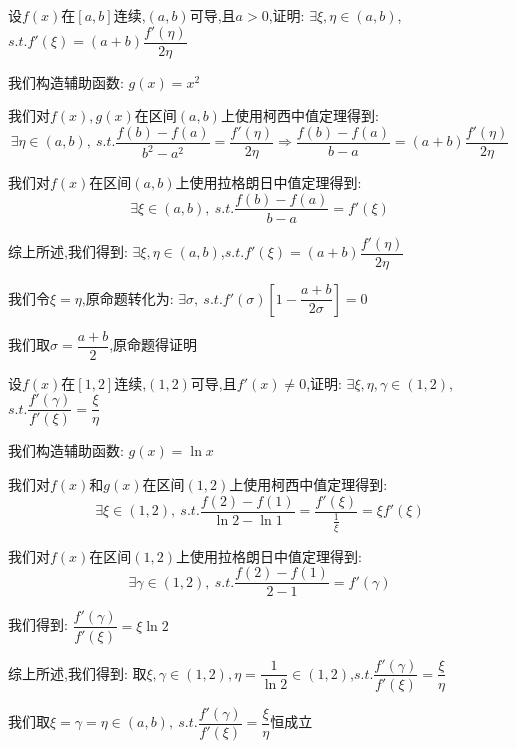 \begin{proposition}
	设$f(x)$在$[a,b]$连续,$(a,b)$可导,且$a>0$,证明: $\exists \xi,\eta\in(a,b)$,$s.t. f'(\xi)=(a+b)\dfrac{f'(\eta)}{2\eta}$
\end{proposition}
\begin{solution}

	我们构造辅助函数: $g(x)=x^2$

	我们对$f(x),g(x)$在区间$(a,b)$上使用柯西中值定理得到:
	$$\exists\eta\in(a,b),\ s.t. \dfrac{f(b)-f(a)}{b^2-a^2}=\dfrac{f'(\eta)}{2\eta}\Rightarrow \dfrac{f(b)-f(a)}{b-a}=(a+b)\dfrac{f'(\eta)}{2\eta}$$

	我们对$f(x)$在区间$(a,b)$上使用拉格朗日中值定理得到:
	$$\exists\xi\in(a,b),\ s.t. \dfrac{f(b)-f(a)}{b-a}=f'(\xi)$$

	综上所述,我们得到: $\exists \xi,\eta\in(a,b)$,$s.t. f'(\xi)=(a+b)\dfrac{f'(\eta)}{2\eta}$
\end{solution}
\begin{anymark}[注]
	我们令$\xi=\eta$,原命题转化为: $\exists \sigma,\ s.t. f'(\sigma)[1-\dfrac{a+b}{2\sigma}]=0$

	我们取$\sigma=\dfrac{a+b}{2}$,原命题得证明
\end{anymark}

\begin{proposition}
	设$f(x)$在$[1,2]$连续,$(1,2)$可导,且$f'(x)\neq 0$,证明: $\exists \xi,\eta,\gamma\in(1,2)$,$s.t. \dfrac{f'(\gamma)}{f'(\xi)}=\dfrac{\xi}{\eta}$
\end{proposition}
\begin{solution}

	我们构造辅助函数: $g(x)=\ln x$

	我们对$f(x)$和$g(x)$在区间$(1,2)$上使用柯西中值定理得到:
	$$\exists\xi\in(1,2),\ s.t. \dfrac{f(2)-f(1)}{\ln 2-\ln 1}=\dfrac{f'(\xi)}{\frac{1}{\xi}}=\xi f'(\xi)$$

	我们对$f(x)$在区间$(1,2)$上使用拉格朗日中值定理得到:
	$$\exists\gamma\in(1,2),\ s.t. \dfrac{f(2)-f(1)}{2-1}=f'(\gamma)$$

	我们得到: $\dfrac{f'(\gamma)}{f'(\xi)}=\xi \ln 2$

	综上所述,我们得到: 取$\xi,\gamma\in(1,2),\eta=\dfrac{1}{\ln2}\in(1,2)$,$s.t. \dfrac{f'(\gamma)}{f'(\xi)}=\dfrac{\xi}{\eta}$
\end{solution}
\begin{anymark}[注]
	我们取$\xi=\gamma=\eta\in(a,b),\ s.t. \dfrac{f'(\gamma)}{f'(\xi)}=\dfrac{\xi}{\eta}$恒成立
\end{anymark}

